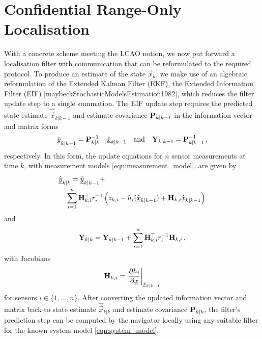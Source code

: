 \section{Confidential Range-Only Localisation}\label{sec:nonlin_fusion:conf_range_only_localisation}
With a concrete scheme meeting the LCAO notion, we now put forward a localisation filter with communication that can be reformulated to the required protocol. To produce an estimate of the state $\vec{x}_k$, we make use of an algebraic reformulation of the Extended Kalman Filter (EKF), the Extended Information Filter (EIF) [maybeckStochasticModelsEstimation1982], which reduces the filter update step to a single summation. The EIF update step requires the predicted state estimate $\hat{\vec{x}}_{k|k-1}$ and estimate covariance ${{\mathbf{P}}}_{k|k-1}$ in the information vector and matrix forms
\begin{equation}
    \hat{{\underline{y}}}_{k|k-1} = {{\mathbf{P}}}_{k|k-1}^{-1}\hat{{\underline{x}}}_{k|k-1} \quad\textrm{and}\quad {\ensuremath{{\mathbf{Y}}}}_{k|k-1} = {{\mathbf{P}}}_{k|k-1}^{-1}\,,
\end{equation}
respectively. In this form, the update equations for $n$ sensor measurements at time $k$, with measurement models \eqref{eqn:measurement_model}, are given by
\begin{equation}
    \begin{split}
        &\hat{{\underline{y}}}_{k|k} = \hat{{\underline{y}}}_{k|k-1} + \\
        &\quad \sum^n_{i=1}{{\mathbf{H}}}^\top_{k,i} r^{-1}_i \left(z_{k,i} - h_i(\hat{{\underline{x}}}_{k|k-1}) + {{\mathbf{H}}}_{k,i}\hat{{\underline{x}}}_{k|k-1}\right)
    \end{split} \label{eqn:eif_info_vec_update}
\end{equation}
and
\begin{equation}
    {\ensuremath{{\mathbf{Y}}}}_{k|k} = {{\mathbf{Y}}}_{k|k-1} + \sum^n_{i=1}{{\mathbf{H}}}^\top_{k,i} r^{-1}_i {{\mathbf{H}}}_{k,i}\,, \label{eqn:eif_info_mat_update}
\end{equation}
with Jacobians
\begin{equation}
    {\ensuremath{{\mathbf{H}}}}_{k,i} = \left.\frac{\partial h_i}{\partial {\underline{x}}}\right|_{\hat{{\underline{x}}}_{k|k-1}} \label{eqn:measurement_jacobian}
\end{equation}
for sensors $i\in\{1,\dots,n\}$. After converting the updated information vector and matrix back to state estimate $\hat{\vec{x}}_{k|k}$ and estimate covariance ${{\mathbf{P}}}_{k|k}$, the filter's prediction step can be computed by the navigator locally using any suitable filter for the known system model \eqref{eqn:system_model}.


